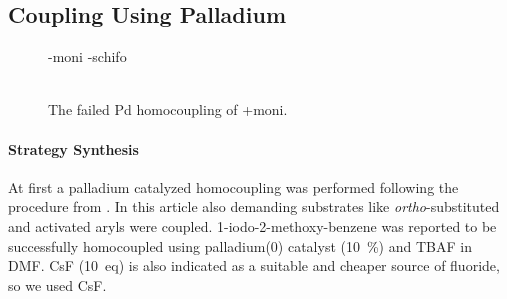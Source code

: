 % 
% 
% 
% 



\subsection{Coupling Using Palladium}
  \begin{figure}
    \cmpdref-{moni}
    \cmpdref-{schifo}
  \caption{\\ The failed Pd homocoupling of \cmpd+{moni}.\label{sc:moni-polimero}}
  \end{figure}

  \paragraph{Strategy Synthesis}
    At first a palladium catalyzed homo\-coupling was performed following the procedure from \citet{Seganish2005}. In this article also demanding substrates like \emph{ortho}-substituted and activated%
 aryls were coupled. 1-iodo-2-methoxy-benzene was reported to be successfully homo\-coupled using palladium(0) catalyst (10~\%) and TBAF in DMF. CsF (10~eq) is also indicated as a suitable and cheaper source of fluoride, so we used CsF.

